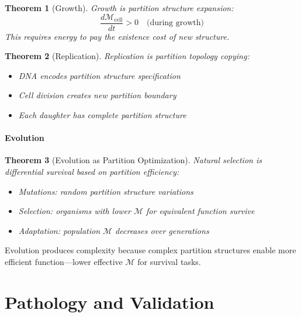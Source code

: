 \documentclass[twocolumn,10pt,a4paper]{article}
\newtheorem{theorem}{Theorem}[section]
\theoremstyle{definition}
\theoremstyle{remark}
\newcommand{\Depth}{\mathcal{M}}
\begin{document}
\begin{theorem}[Growth]
\label{thm:growth}
Growth is partition structure expansion:
\begin{equation}
    \frac{d\Depth_{\mathrm{cell}}}{dt} > 0 \quad \text{(during growth)}
\end{equation}
This requires energy to pay the existence cost of new structure.
\end{theorem}

\begin{theorem}[Replication]
\label{thm:replication}
Replication is partition topology copying:
\begin{itemize}
    \item DNA encodes partition structure specification
    \item Cell division creates new partition boundary
    \item Each daughter has complete partition structure
\end{itemize}
\end{theorem}

\subsection{Evolution}

\begin{theorem}[Evolution as Partition Optimization]
\label{thm:evolution}
Natural selection is differential survival based on partition efficiency:
\begin{itemize}
    \item Mutations: random partition structure variations
    \item Selection: organisms with lower $\Depth$ for equivalent function survive
    \item Adaptation: population $\Depth$ decreases over generations
\end{itemize}
\end{theorem}

Evolution produces complexity because complex partition structures enable more efficient function---lower effective $\Depth$ for survival tasks.



\part{Pathology and Validation}
\end{document}
